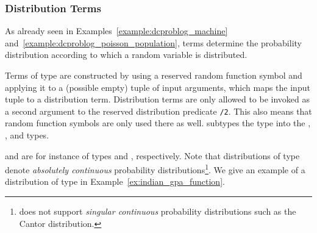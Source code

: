 






\subsubsection{Distribution Terms}
As already seen in Examples~\ref{example:dcproblog_machine} and~\ref{example:dcproblog_poisson_population},  terms determine the probability distribution according to which a random variable is distributed.

\begin{definition}
	Terms of type  are constructed by using a reserved random function symbol and applying it to a (possible empty) tuple of input arguments, which maps the input tuple to a distribution term.
	Distribution terms are only allowed to be invoked as a second argument to the reserved distribution predicate \lstinline[columns=fixed]|/2|.
	This also means that random function symbols are only used there as well. \dcproblogsty subtypes the  type into the , , and  types.
\end{definition}

 and  are for instance of types  and  , respectively.
Note that distributions of type  denote {\em absolutely continuous} probability distributions\footnote{\dcproblogsty does not support {\em singular continuous} probability distributions such as the Cantor distribution.}.  We give an example of a distribution of type  in Example~\ref{ex:indian_gpa_function}.



